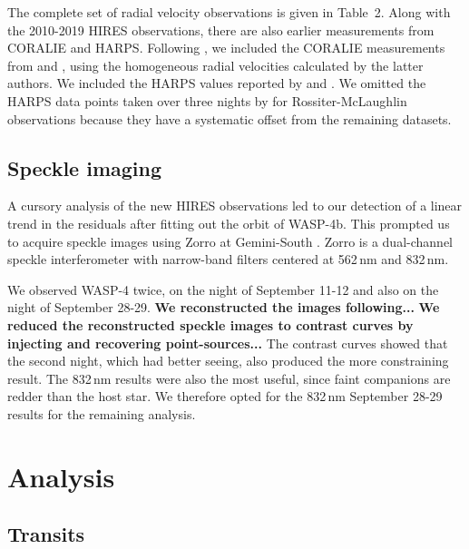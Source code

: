 \documentclass[12pt,twocolumn,tighten]{aastex62}
\begin{document}
The complete set of radial velocity observations is given in Table~2.
Along with the 2010-2019 HIRES observations, there are also earlier
measurements from CORALIE and HARPS.  Following
, we included the CORALIE measurements
from \citet{wilson_wasp-4b_2008} and \citet{triaud_spin-orbit_2010},
using the homogeneous radial velocities calculated by the latter
authors. We included the HARPS values reported by
\citet{pont_determining_2011} and \citet{husnoo_observational_2012}.
We omitted the HARPS data points taken over three nights by
\citet{triaud_spin-orbit_2010} for Rossiter-McLaughlin observations
because they have a systematic offset from the remaining datasets.

\subsection{Speckle imaging}

A cursory analysis of the new HIRES observations led to our detection
of a linear trend in the residuals after fitting out the orbit of
WASP-4b.  This prompted us to acquire speckle images using Zorro at
Gemini-South \citep[see][and the instrument
web-pages\footnote{\url{www.gemini.edu/sciops/instruments/alopeke-zorro/}}]{scott_nessi_2018}.
Zorro is a dual-channel speckle interferometer with narrow-band
filters centered at 562$\,$nm and 832$\,$nm.  

We observed WASP-4 twice, on the night of September 11-12 and also
on the night of September 28-29. 
{\bf We reconstructed the images following...}
{\bf We reduced the reconstructed speckle images to contrast curves by
injecting and recovering point-sources...}
The contrast curves showed that the second night, which had better
seeing, also produced the more constraining result.  The 832$\,$nm
results were also the most useful, since faint companions are redder than
the host star.  We therefore opted for the 832$\,$nm September 28-29
results for the remaining analysis.



\section{Analysis}
\label{sec:analysis}

\subsection{Transits}
\label{sec:transit_analysis}
\end{document}
